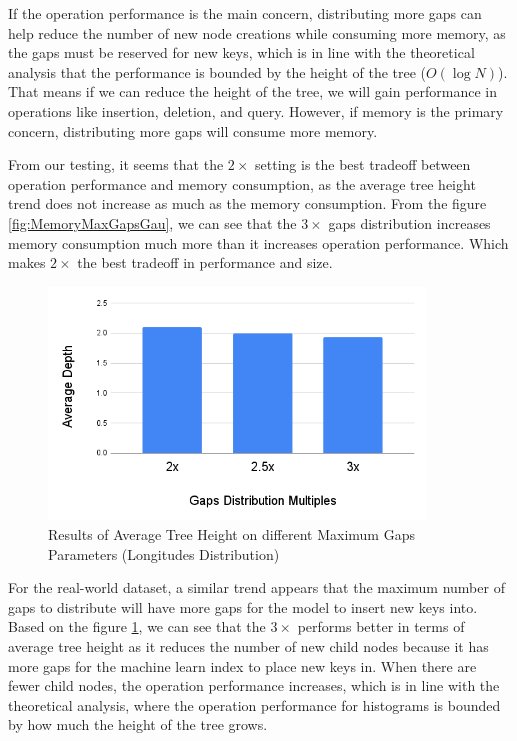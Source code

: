 If the operation performance is the main concern, distributing more gaps can help reduce the number of new node creations while consuming more memory, as the gaps must be reserved for new keys, which is in line with the theoretical analysis that the performance is bounded by the height of the tree ($O(\log N)$). That means if we can reduce the height of the tree, we will gain performance in operations like insertion, deletion, and query. However, if memory is the primary concern, distributing more gaps will consume more memory.

From our testing, it seems that the $2\times$ setting is the best tradeoff between operation performance and memory consumption, as the average tree height trend does not increase as much as the memory consumption. From the figure \ref{fig:MemoryMaxGapsGau}, we can see that the $3\times$ gaps distribution increases memory consumption much more than it increases operation performance. Which makes $2\times$ the best tradeoff in performance and size. 
\begin{figure}[H]
    \centering
    \includegraphics[width=100mm,scale=1]{Figures/AvgLogMaxGaps.png}
    \caption{
     Results of Average Tree Height on different Maximum Gaps Parameters (Longitudes Distribution)
    }
    \label{fig:AvgLogMaxGaps}
\end{figure}
For the real-world dataset, a similar trend appears that the maximum number of gaps to distribute will have more gaps for the model to insert new keys into. Based on the figure \ref{fig:AvgLogMaxGaps}, we can see that the $3\times$ performs better in terms of average tree height as it reduces the number of new child nodes because it has more gaps for the machine learn index to place new keys in. When there are fewer child nodes, the operation performance increases, which is in line with the theoretical analysis, where the operation performance for histograms is bounded by how much the height of the tree grows.
